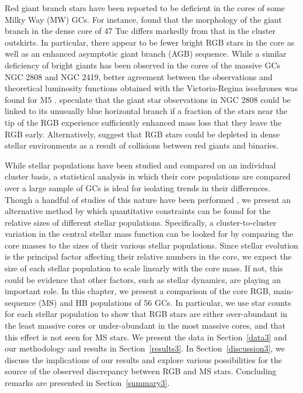 Red giant branch stars have been reported to be deficient in the cores
of some Milky Way (MW) GCs.  For instance, \citet{bailyn94} found that the
morphology of the giant branch in the dense core of 47 Tuc differs
markedly from that in the cluster outskirts.  In particular, there
appear to be fewer bright RGB stars in the core as well as an
enhanced asymptotic giant branch (AGB) sequence.  While
a similar deficiency of bright giants has been observed in the cores
of the massive GCs NGC 2808 and NGC 2419, better agreement between the
observations and theoretical luminosity functions obtained with the
Victoria-Regina isochrones was found for M5 \citep{sandquist07,
  sandquist08}.  \citet{sandquist07} speculate that the giant star 
observations in NGC 2808 could be linked to its unusually blue horizontal
branch if a fraction of the stars near the tip of the RGB experience
sufficiently enhanced mass loss that they leave the RGB early.
Alternatively, \citet{beer03} suggest that RGB stars could be depleted
in dense stellar environments as a result of collisions between red
giants and binaries. 

While stellar populations have been studied and compared on an
individual cluster basis, a statistical analysis in which their core
populations are compared over a large sample of GCs is ideal for
isolating trends in their differences.  Though a handful of studies of this
nature have been performed \citep[e.g.][]{piotto04}, we present an
alternative method by which quantitative constraints can be found for
the relative sizes of different stellar populations.  Specifically, a 
cluster-to-cluster variation in the central stellar mass function can
be looked for by comparing the core masses to the sizes of their
various stellar populations.  Since stellar evolution is the principal
factor affecting their relative numbers in the core, we expect the
size of each stellar population to scale linearly with the core mass.
If not, this could be evidence
that other factors, such as stellar dynamics, are playing an
important role.  
In this chapter, we present a comparison of the core 
RGB, main-sequence (MS) and HB populations of 56 GCs.
In particular, we use star 
counts for each stellar population to show that RGB stars are either 
over-abundant in the least massive cores or under-abundant in the most
massive cores, and that this effect is not
seen for MS stars.  We present the data in Section~\ref{data3} and our
methodology and results in Section~\ref{results3}.  In
Section~\ref{discussion3}, we discuss the implications of our results
and explore various possibilities for the source of the observed
discrepancy between RGB and MS stars.  Concluding remarks are
presented in Section~\ref{summary3}. 

